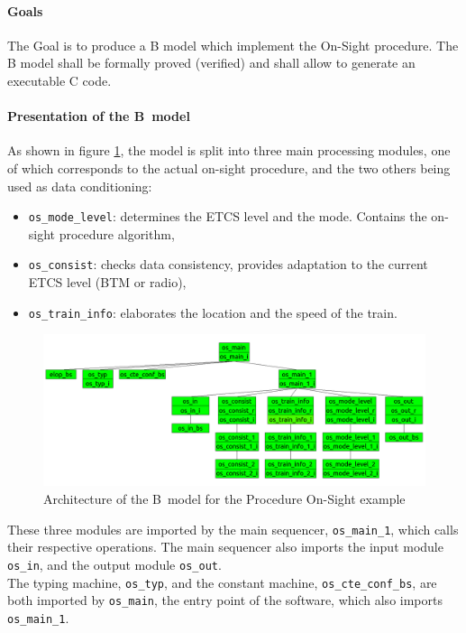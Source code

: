 \paragraph{Goals}
The Goal is to produce a B model which implement the On-Sight procedure.
The B model shall be formally proved (verified) and shall allow to generate an executable C code.


\paragraph{Presentation of the B~model}
As shown in figure \ref{fig:procos}, the model is split into three main processing modules, one of which corresponds to the actual on-sight procedure,
and the two others being used as data conditioning:
\begin{itemize}
\item \verb+os_mode_level+: determines the ETCS level and the mode. Contains the on-sight procedure algorithm,
\item \verb+os_consist+: checks data consistency, provides adaptation to the current ETCS level (BTM or radio),
\item \verb+os_train_info+: elaborates the location and the speed of the train.
\end{itemize}

\begin{figure}[h!]
\centering
\includegraphics[width=1\textwidth]{figures/procedureos}
\caption{Architecture of the B~model for the Procedure On-Sight example}
\label{fig:procos}
\end{figure}

These three modules are imported by the main sequencer, \verb+os_main_1+, which calls their respective operations. The main sequencer also imports the input module \verb+os_in+, and the output module \verb+os_out+.\\
The typing machine, \verb+os_typ+, and the constant machine, \verb+os_cte_conf_bs+, are both imported by \verb+os_main+, the entry point of the software, which also imports \verb+os_main_1+.\\
 
